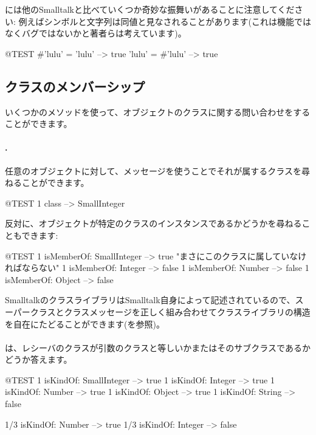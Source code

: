 \documentclass[a4paper,10pt,twoside]{book}
\begin{document}
\pharo には他のSmalltalkと比べていくつか奇妙な振舞いがあることに注意してください: 例えばシンボルと文字列は同値と見なされることがあります(これは機能ではなくバグではないかと著者らは考えています)。

\begin{code}{@TEST}
#'lulu' = 'lulu' --> true
'lulu' = #'lulu' --> true
\end{code}


\subsection{クラスのメンバーシップ}
いくつかのメソッドを使って、オブジェクトのクラスに関する問い合わせをすることができます。

\paragraph{.} 任意のオブジェクトに対して、メッセージを使うことでそれが属するクラスを尋ねることができます。
\begin{code}{@TEST}
1 class --> SmallInteger
\end{code}

反対に、オブジェクトが特定のクラスのインスタンスであるかどうかを尋ねることもできます:
\begin{code}{@TEST}
1 isMemberOf: SmallInteger --> true    "まさにこのクラスに属していなければならない"
1 isMemberOf: Integer          --> false
1 isMemberOf: Number        --> false
1 isMemberOf: Object           --> false
\end{code}

SmalltalkのクラスライブラリはSmalltalk自身によって記述されているので、スーパークラスとクラスメッセージを正しく組み合わせてクラスライブラリの構造を自在にたどることができます(を参照)。

\paragraph{}
は、レシーバのクラスが引数のクラスと等しいかまたはそのサブクラスであるかどうか答えます。

\begin{code}{@TEST}
1 isKindOf: SmallInteger --> true
1 isKindOf: Integer          --> true
1 isKindOf: Number         --> true
1 isKindOf: Object           --> true
1 isKindOf: String            --> false

1/3 isKindOf: Number      --> true
1/3 isKindOf: Integer        --> false
\end{code}
\end{document}
